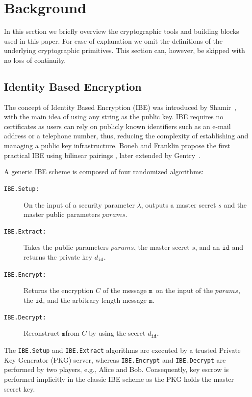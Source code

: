 \documentclass{llncs}
\newcommand{\msg}{\ensuremath{\mathtt{m}}}
\newcommand{\id}[1]{\ensuremath{\mathtt{id}_{#1}}}
\begin{document}
\section{Background}\label{sec:background}
In this section we briefly overview the cryptographic tools and building blocks used in this paper. For ease of explanation we omit the definitions of the underlying cryptographic primitives. This section 
can, however, be skipped with no loss of continuity.

\subsection{Identity Based Encryption}
The concept of Identity Based Encryption (IBE) was introduced by Shamir~\cite{DBLP:conf/crypto/Shamir84}, with the main idea of using any string as the public key. IBE requires no certificates as users can rely on publicly known identifiers such as an e-mail address or a telephone number, thus, reducing the complexity of establishing and managing a public key infrastructure. Boneh and Franklin propose the first practical IBE using bilinear pairings \cite{BonehFranklinIBE}, later extended by Gentry~\cite{GentryRandomOracles}. 

A generic IBE scheme is composed of four randomized algorithms:
\begin{description}
    \item[\texttt{IBE.Setup:}] On the input of a security parameter $\lambda$, outputs a master secret $s$ and the master public parameters $params$. 
    \item[\texttt{IBE.Extract:}] Takes the public parameters $params$, the master secret $s$, and an \id{} and returns the private key $d_{\id{}}$.
    \item[\texttt{IBE.Encrypt:}] Returns the encryption $C$ of the message \msg\ on the input of the $params$, the \id{}, and the arbitrary length message \msg. 
    \item[\texttt{IBE.Decrypt:}] Reconstruct \msg from $C$ by using the secret $d_{\id{}}$.
\end{description}

The \texttt{IBE.Setup} and \texttt{IBE.Extract} algorithms are executed by a trusted Private Key Generator (PKG) server, whereas \texttt{IBE.Encrypt} and \texttt{IBE.Decrypt} are performed by two players, e.g., Alice and Bob. Consequently, key escrow is performed implicitly in the classic IBE scheme as the PKG holds the master secret key.
\end{document}

